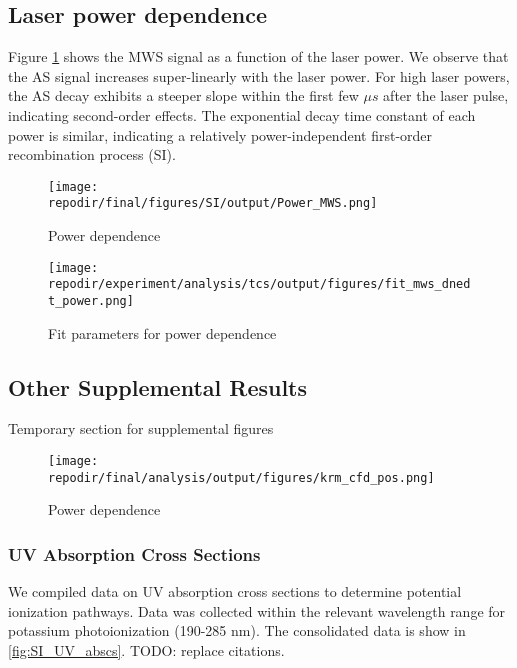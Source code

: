 \subsection{Laser power dependence}

Figure \ref{fig:SI_power_dependence} shows the MWS signal as a function of the laser power. We observe that the AS signal increases super-linearly with the laser power. For high laser powers, the AS decay exhibits a steeper slope within the first few $\mu s$ after the laser pulse, indicating second-order effects. The exponential decay time constant of each power is similar, indicating a relatively power-independent first-order recombination process (SI).

\begin{figure}[h]
    \texttt{[image: \\repodir/final/figures/SI/output/Power\_MWS.png]} 
    \caption{Power dependence}
    \label{fig:SI_power_dependence}
\end{figure}

\begin{figure}[h]
    \texttt{[image: \\repodir/experiment/analysis/tcs/output/figures/fit\_mws\_dnedt\_power.png]} 
    \caption{Fit parameters for power dependence}
    \label{fig:SI_power_dependence_fit}
\end{figure}

\clearpage

\subsection{Other Supplemental Results}

Temporary section for supplemental figures


\begin{figure}[h]
    \texttt{[image: \\repodir/final/analysis/output/figures/krm\_cfd\_pos.png]} 
    \caption{Power dependence}
    \label{fig:SI_krm_cfd_pos.png}
\end{figure}


\subsubsection{UV Absorption Cross Sections}

We compiled data on UV absorption cross sections to determine potential ionization pathways. Data was collected within the relevant wavelength range for potassium photoionization (190-285 nm). The consolidated data is show in \ref{fig:SI_UV_abscs}. TODO: replace citations. 

